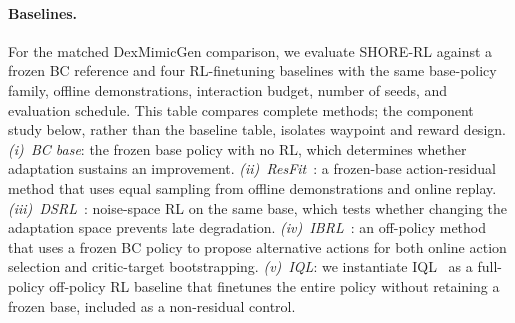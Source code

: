 \documentclass[letterpaper]{article} %
\begin{document}
\paragraph{Baselines.}
For the matched DexMimicGen comparison, we evaluate SHORE-RL against a frozen
BC reference and four RL-finetuning baselines with the same base-policy family,
offline demonstrations, interaction budget, number of seeds, and evaluation
schedule. This table compares complete methods; the component study below,
rather than the baseline table, isolates waypoint and reward design.
\emph{(i)~BC base}: the
frozen base policy with no RL, which determines whether adaptation sustains an
improvement. \emph{(ii)~ResFit}~\cite{resfit2025residual}: a frozen-base
action-residual method that uses equal sampling from offline demonstrations
and online replay.
\emph{(iii)~DSRL}~\cite{wagenmaker2025dsrl}: noise-space RL on the same base,
which tests whether changing the adaptation space prevents late degradation.
\emph{(iv)~IBRL}~\cite{hu2023imitation}: an off-policy method that uses a frozen
BC policy to propose alternative actions for both online action selection and
critic-target bootstrapping. \emph{(v)~IQL}: we instantiate
IQL~\cite{kostrikov2022iql} as a full-policy off-policy RL baseline that finetunes
the entire policy without retaining a frozen base, included as a non-residual control.
\end{document}
